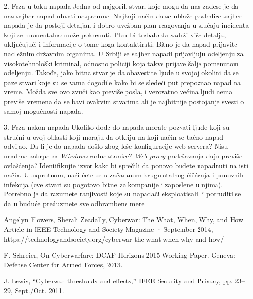 \documentclass[a4paper]{article}
\begin{document}
{2. Faza u toku napada
Jedna od najgorih stvari koje mogu da nas zadese je da nas sajber napad uhvati nespremne. Najboji način da se ublaže posledice sajber napada je da postoji detaljan i dobro uvežban plan reagovanja u slučaju incidenta koji se momentalno može pokrenuti. Plan bi trebalo da sadrži više detalja, uključujući i informacije o tome koga kontaktirati. Bitno je da napad prijavite nadležnim državnim organima. U Srbiji se sajber napadi prijavljuju odeljenju za visokotehnološki kriminal, odnosno policiji koja takve prijave šalje pomenutom odeljenju. Takođe, jako bitna stvar je da obavestite ljude u svojoj okolini da se paze stvari koje su se vama dogodile kako bi se sledeći put prepoznao napad na vreme. Možda sve ovo zvuči kao previše posla, i verovatno većina ljudi nema previše vremena da se bavi ovakvim stvarima ali je najbitnije postojanje svesti o samoj mogućnosti napada.

3. Faza nakon napada
Ukoliko dođe do napada morate pozvati ljude koji su stručni u ovoj oblasti koji moraju da otkriju na koji način se tačno napad odvijao. Da li je do napada došlo zbog loše konfiguracije web servera? Nisu urađene zakrpe za \emph{Windows} radne stanice? \emph{Web proxy} podešavanja daju previše ovlašćenja? Identifikujte izvor kako bi sprečili da ponovo budete napadnuti na isti način. U suprotnom, naći ćete se u začaranom krugu stalnog čišćenja i ponovnih infekcija (ove stvari su pogotovo bitne za kompanije i zaposlene u njima). Potrebno je da razumete ranjivosti koje su napadači eksploatisali, i potruditi se da u buduće preduzmete sve odbrambene mere.


  

\appendix

\begin{thebibliography}{9}

 Angelyn Flowers, Sherali Zeadally, Cyberwar: The What, When, Why, and How
  Article in IEEE Technology and Society Magazine · September 2014,
  https://technologyandsociety.org/cyberwar-the-what-when-why-and-how/

 F. Schreier, On Cyberwarfare: DCAF Horizons 2015 Working
Paper. Geneva: Defense Center for Armed Forces, 2013.

 J. Lewis, “Cyberwar thresholds and effects,” IEEE Security and
Privacy, pp. 23–29, Sept./Oct. 2011.


\end{thebibliography}}
\end{document}
